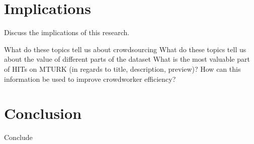 \documentclass[letterpaper,12pt]{article}
\begin{document}
\chapter{Implications}
Discuss the implications of this research.

What do these topics tell us about crowdsourcing
What do these topics tell us about the value of different parts of the dataset
What is the most valuable part of HITs on MTURK (in regards to title, description, preview)?
How can this information be used to improve crowdworker efficiency?

\chapter{Conclusion}
Conclude
\end{document}

